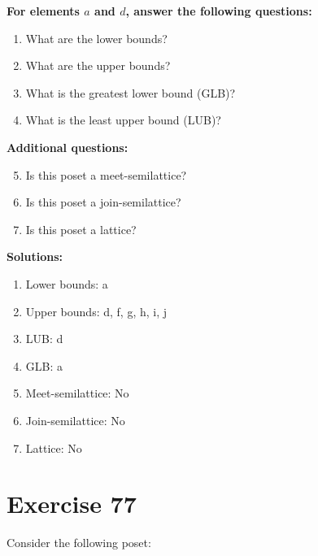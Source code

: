 \documentclass{article}
\begin{document}
    \textbf{For elements $a$ and $d$, answer the following questions:}
\begin{enumerate}
    \item What are the lower bounds?
    \item What are the upper bounds?
    \item What is the greatest lower bound (GLB)?
    \item What is the least upper bound (LUB)?
\end{enumerate}
    \hspace*{3ex} \textbf{Additional questions:}
\begin{enumerate}
    \setcounter{enumi}{4}
    \item Is this poset a meet-semilattice?
    \item Is this poset a join-semilattice?
    \item Is this poset a lattice?
\end{enumerate}

\textbf{Solutions:}
\begin{enumerate}
    \item Lower bounds: {a}
    \item Upper bounds: {d, f, g, h, i, j}
    \item LUB: d
    \item GLB: a
    \item Meet-semilattice: No
    \item Join-semilattice: No
    \item Lattice: No
\end{enumerate}
\newpage
\section*{Exercise 77}
Consider the following poset:
\begin{center}
\end{center}
\end{document}
